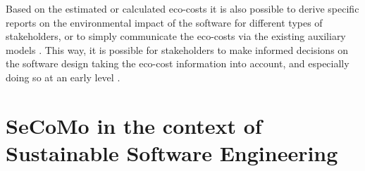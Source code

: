 \documentclass[oribibl]{llncs}
\begin{document}
Based on the estimated or calculated eco-costs it is also possible to derive specific reports on the environmental impact of the software for different types of stakeholders, or to simply communicate the eco-costs via the existing auxiliary models \cite{schulze_cost_2016}. This way, it is possible for stakeholders to make informed decisions on the software design taking the eco-cost information into account, and especially doing so at an early level \cite{schulze_cost_2016}.



\section{SeCoMo in the context of Sustainable Software Engineering}
\end{document}
